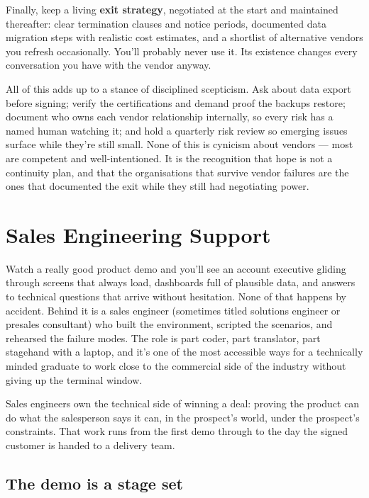 Finally, keep a living \textbf{exit strategy}, negotiated at the start and maintained thereafter: clear termination clauses and notice periods, documented data migration steps with realistic cost estimates, and a shortlist of alternative vendors you refresh occasionally. You'll probably never use it. Its existence changes every conversation you have with the vendor anyway.


All of this adds up to a stance of disciplined scepticism. Ask about data export before signing; verify the certifications and demand proof the backups restore; document who owns each vendor relationship internally, so every risk has a named human watching it; and hold a quarterly risk review so emerging issues surface while they're still small. None of this is cynicism about vendors — most are competent and well-intentioned. It is the recognition that hope is not a continuity plan, and that the organisations that survive vendor failures are the ones that documented the exit while they still had negotiating power.

\section{Sales Engineering Support}
Watch a really good product demo and you'll see an account executive gliding through screens that always load, dashboards full of plausible data, and answers to technical questions that arrive without hesitation. None of that happens by accident. Behind it is a sales engineer (sometimes titled solutions engineer or presales consultant) who built the environment, scripted the scenarios, and rehearsed the failure modes. The role is part coder, part translator, part stagehand with a laptop, and it's one of the most accessible ways for a technically minded graduate to work close to the commercial side of the industry without giving up the terminal window.


Sales engineers own the technical side of winning a deal: proving the product can do what the salesperson says it can, in the prospect's world, under the prospect's constraints. That work runs from the first demo through to the day the signed customer is handed to a delivery team.



\subsection{The demo is a stage set}


